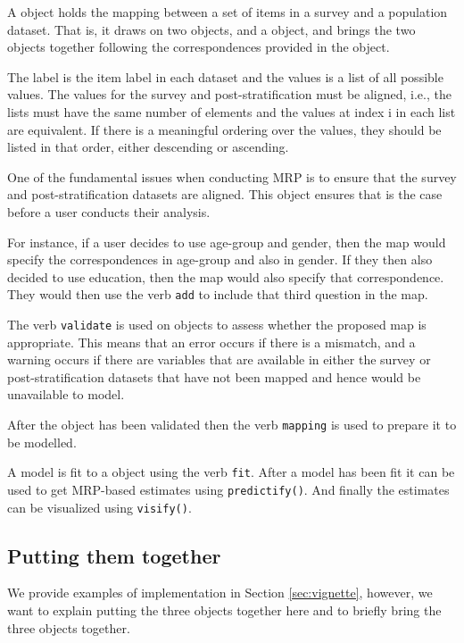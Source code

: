 \documentclass[
]{jss}
\begin{document}
A  object holds the mapping between a set of items
in a survey and a population dataset. That is, it draws on two
 objects, and a  object,
and brings the two  objects together following the
correspondences provided in the  object.

The label is the item label in each dataset and the values is a list of
all possible values. The values for the survey and post-stratification
must be aligned, i.e., the lists must have the same number of elements
and the values at index i in each list are equivalent. If there is a
meaningful ordering over the values, they should be listed in that
order, either descending or ascending.

One of the fundamental issues when conducting MRP is to ensure that the
survey and post-stratification datasets are aligned. This object ensures
that is the case before a user conducts their analysis.

For instance, if a user decides to use age-group and gender, then the
map would specify the correspondences in age-group and also in gender.
If they then also decided to use education, then the map would also
specify that correspondence. They would then use the verb \texttt{add}
to include that third question in the map.

The verb \texttt{validate} is used on  objects to
assess whether the proposed map is appropriate. This means that an error
occurs if there is a mismatch, and a warning occurs if there are
variables that are available in either the survey or post-stratification
datasets that have not been mapped and hence would be unavailable to
model.

After the  object has been validated then the verb
\texttt{mapping} is used to prepare it to be modelled.

A model is fit to a  object using the verb
\texttt{fit}. After a model has been fit it can be used to get MRP-based
estimates using \texttt{predictify()}. And finally the estimates can be
visualized using \texttt{visify()}.

\subsection{Putting them together}

We provide examples of implementation in Section \ref{sec:vignette},
however, we want to explain putting the three objects together here and
to briefly bring the three objects together.
\end{document}
